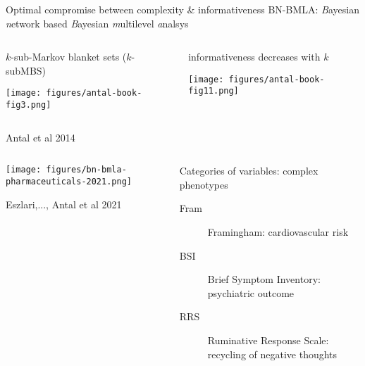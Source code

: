 \documentclass[aspectratio=169]{beamer}
\begin{document}
\begin{frame}{Optimal compromise between complexity \& informativeness}
  {BN-BMLA: \emph{B}ayesian \emph{n}etwork based \emph{B}ayesian \emph{m}ultilevel
  \emph{a}nalsys}

\begin{columns}[t]
\begin{column}{0.5\textwidth}
  $k$-sub-Markov blanket sets ($k$-subMBS)

\texttt{[image: figures/antal-book-fig3.png]}
\end{column}

\begin{column}{0.5\textwidth}
  informativeness decreases with $k$

\texttt{[image: figures/antal-book-fig11.png]}
\end{column}
\end{columns}
\begin{center}
  \tiny{Antal et al 2014}
\end{center}
\end{frame}


\begin{frame}%
\begin{columns}[t]
\begin{column}{0.5\textwidth}

\texttt{[image: figures/bn-bmla-pharmaceuticals-2021.png]}

\begin{center}
\tiny{Eszlari,..., Antal et al 2021}
\end{center}
\end{column}

\begin{column}{0.5\textwidth}

Categories of variables: complex phenotypes
\begin{description}
  \item[Fram] Framingham: cardiovascular risk
  \item[BSI] Brief Symptom Inventory: psychiatric outcome
  \item[RRS] Ruminative Response Scale: recycling of negative thoughts
\end{description}

\end{column}
\end{columns}
\end{frame}
\end{document}
